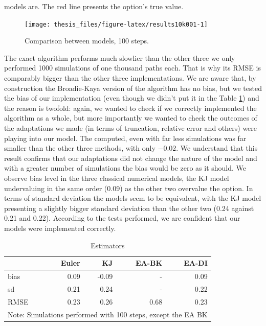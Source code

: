 \documentclass[12pt,oneside]{reedthesis}
\theoremstyle{definition}
\theoremstyle{definition}
\theoremstyle{remark}
\begin{document}
  models are. The red line presents the option's true value.
  \begin{figure}
  
  {\centering \texttt{[image: thesis\_files/figure-latex/results10k001-1]} 
  
  }
  
  \caption{Comparison between models, 100 steps. \label{results10k001}}\label{fig:results10k001}
  \end{figure}
  The exact algorithm performs much slowlier than the other three we only
  performed 1000 simulations of one thousand paths each. That is why its
  RMSE is comparably bigger than the other three implementations. We are
  aware that, by construction the Broadie-Kaya version of the algorithm
  has no bias, but we tested the bias of our implementation (even though
  we didn't put it in the Table \ref{res2}) and the reason is twofold:
  again, we wanted to check if we correctly implemented the algorithm as a
  whole, but more importantly we wanted to check the outcomes of the
  adaptations we made (in terms of truncation, relative error and others)
  were playing into our model. The computed, even with far less
  simulations was far smaller than the other three methods, with only
  \(-0.02\). We understand that this result confirms that our adaptations
  did not change the nature of the model and with a greater number of
  simulations the bias would be zero as it should. We observe bias level
  in the three classical numerical models, the KJ model undervaluing in
  the same order (0.09) as the other two overvalue the option. In terms of
  standard deviation the models seem to be equivalent, with the KJ model
  presenting a slightly bigger standard deviation than the other two (0.24
  against 0.21 and 0.22). According to the tests performed, we are
  confident that our models were implemented correctly.
  \begin{table}[t]
  \centering
  \begin{tabular}{lrrrr}
    \hline 
   & Euler & KJ & EA-BK & EA-DI \\ 
    \hline 
  bias & 0.09 & -0.09 & - & 0.09 \\ 
    sd & 0.21 & 0.24 & - & 0.22 \\ 
    RMSE & 0.23 & 0.26 & 0.68 & 0.23 \\ 
     \hline 
  \multicolumn{5}{l}{\scriptsize{Note: Simulations performed with 100 steps, except the EA BK}} 
  \end{tabular}
  \caption{Estimators} 
  \label{res2}
  \end{table}
\end{document}
